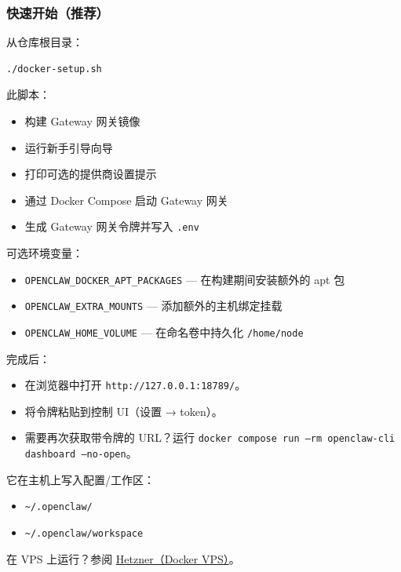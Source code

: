 \subsubsection{快速开始（推荐）}


从仓库根目录：

\begin{lstlisting}[language=bash]
./docker-setup.sh
\end{lstlisting}


此脚本：

\begin{itemize}
  \item 构建 Gateway 网关镜像
  \item 运行新手引导向导
  \item 打印可选的提供商设置提示
  \item 通过 Docker Compose 启动 Gateway 网关
  \item 生成 Gateway 网关令牌并写入 \texttt{.env}
\end{itemize}


可选环境变量：

\begin{itemize}
  \item \texttt{OPENCLAW\_DOCKER\_APT\_PACKAGES} — 在构建期间安装额外的 apt 包
  \item \texttt{OPENCLAW\_EXTRA\_MOUNTS} — 添加额外的主机绑定挂载
  \item \texttt{OPENCLAW\_HOME\_VOLUME} — 在命名卷中持久化 \texttt{/home/node}
\end{itemize}


完成后：

\begin{itemize}
  \item 在浏览器中打开 \texttt{http://127.0.0.1:18789/}。
  \item 将令牌粘贴到控制 UI（设置 → token）。
  \item 需要再次获取带令牌的 URL？运行 \texttt{docker compose run --rm openclaw-cli dashboard --no-open}。
\end{itemize}


它在主机上写入配置/工作区：

\begin{itemize}
  \item \texttt{\textasciitilde{}/.openclaw/}
  \item \texttt{\textasciitilde{}/.openclaw/workspace}
\end{itemize}


在 VPS 上运行？参阅 \href{/install/hetzner}{Hetzner（Docker VPS）}。

